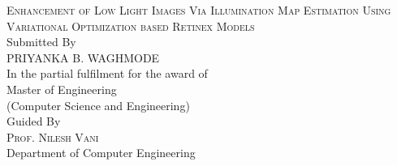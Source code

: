 \begin{titlepage}

\newcommand{\HRule}{\rule{\linewidth}{0.5mm}} %

\center %


\textsc{\normalsize Enhancement of Low Light Images Via Illumination Map Estimation Using Variational Optimization based Retinex Models}\\[1.5cm] %
\normalsize Submitted By\\[0.5cm] %
\textsc{\normalsize PRIYANKA B. WAGHMODE}\\[0.5cm] %
\normalsize In the partial fulfilment for the award of \\[1cm]
\normalsize Master of Engineering\\[0.1cm]
\normalsize (Computer Science and Engineering)\\[1cm]
\normalsize Guided By\\[0.5cm]
\textsc{\normalsize Prof. Nilesh Vani}\\[0.25cm]
\normalsize Department of Computer Engineering\\[0.5cm]







\end{titlepage}

